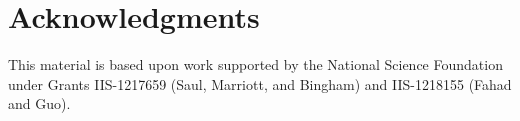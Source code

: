 \documentclass[ letterpaper, 10 pt, conference]{ieeeconf}  %
\begin{document}


\section*{Acknowledgments}
This material is based upon work supported by the National Science Foundation under Grants IIS-1217659 (Saul, Marriott, and Bingham) and IIS-1218155 (Fahad and Guo).


{}



\end{document}
